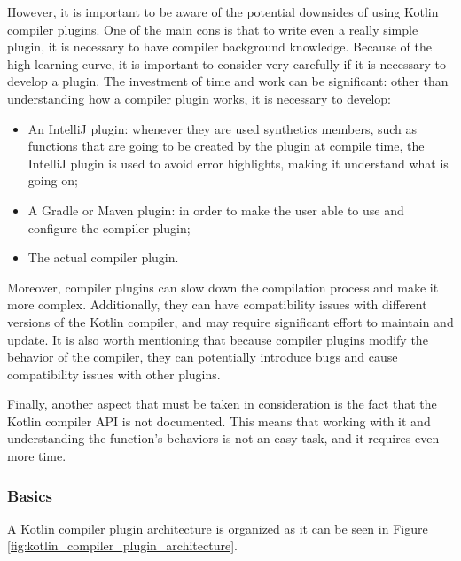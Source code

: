 However, it is important to be aware of the potential downsides of using Kotlin compiler plugins. One of the main cons is that to write even a really simple plugin, it is necessary to have compiler background knowledge. Because of the high learning curve, it is important to consider very carefully if it is necessary to develop a plugin. The investment of time and work can be significant: other than understanding how a compiler plugin works, it is necessary to develop:
\begin{itemize}
    \item An IntelliJ plugin: whenever they are used synthetics members, such as functions that are going to be created by the plugin at compile time, the IntelliJ plugin is used to avoid error highlights, making it understand what is going on;
    \item A Gradle or Maven plugin: in order to make the user able to use and configure the compiler plugin;
    \item The actual compiler plugin.
\end{itemize}

Moreover, compiler plugins can slow down the compilation process and make it more complex. Additionally, they can have compatibility issues with different versions of the Kotlin compiler, and may require significant effort to maintain and update. It is also worth mentioning that because compiler plugins modify the behavior of the compiler, they can potentially introduce bugs and cause compatibility issues with other plugins.

Finally, another aspect that must be taken in consideration is the fact that the Kotlin compiler API is not documented. This means that working with it and understanding the function's behaviors is not an easy task, and it requires even more time.

\subsubsection{Basics}
A Kotlin compiler plugin architecture is organized as it can be seen in Figure \ref{fig:kotlin_compiler_plugin_architecture}.

